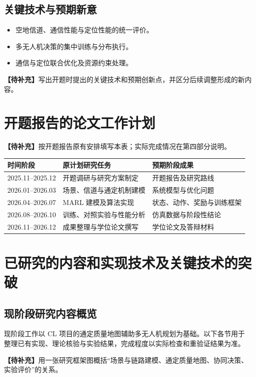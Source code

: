\documentclass[UTF8,a4paper,12pt,fontset=fandol]{ctexart}
\newcommand{\pending}[1]{\par\noindent\textbf{【待补充】}#1\par}
\begin{document}
\subsection{关键技术与预期新意}
\begin{itemize}
  \item 空地信道、通信性能与定位性能的统一评价。
  \item 多无人机决策的集中训练与分布执行。
  \item 通信与定位联合优化及资源约束处理。
\end{itemize}
\pending{写出开题时提出的关键技术和预期创新点，并区分后续调整形成的新内容。}

\section{开题报告的论文工作计划}

\pending{按开题报告原有安排填写本表；实际完成情况在第四部分说明。}
\begin{center}
  \renewcommand{\arraystretch}{1.35}
  \begin{tabularx}{\textwidth}{p{3.3cm}XX}
    \toprule
    时间阶段 & 原计划研究任务 & 预期阶段成果 \\
    \midrule
    2025.11--2025.12 & 开题调研与研究方案制定 & 开题报告及研究路线 \\
    2026.01--2026.03 & 场景、信道与通定机制建模 & 系统模型与优化问题 \\
    2026.04--2026.07 & MARL 建模及算法实现 & 状态、动作、奖励与训练框架 \\
    2026.08--2026.10 & 训练、对照实验与性能分析 & 仿真数据与阶段性结论 \\
    2026.11--2026.12 & 成果整理与学位论文撰写 & 学位论文及答辩材料 \\
    \bottomrule
  \end{tabularx}
\end{center}

\section{已研究的内容和实现技术及关键技术的突破}

\subsection{现阶段研究内容概览}
现阶段工作以 CL 项目的通定质量地图辅助多无人机规划为基础。以下各节用于整理已有实现、理论核验与实验结果，完成程度以实际检查和重验证结果为准。
\pending{用一张研究框架图概括“场景与链路建模、通定质量地图、协同决策、实验评价”的关系。}
\end{document}
